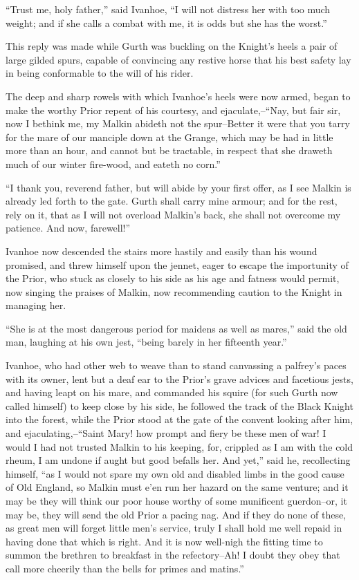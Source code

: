 ``Trust me, holy father,'' said Ivanhoe, ``I will not distress her with
too much weight; and if she calls a combat with me, it is odds but she
has the worst.''

This reply was made while Gurth was buckling on the Knight's heels a
pair of large gilded spurs, capable of convincing any restive horse that
his best safety lay in being conformable to the will of his rider.

The deep and sharp rowels with which Ivanhoe's heels were now armed,
began to make the worthy Prior repent of his courtesy, and
ejaculate,--``Nay, but fair sir, now I bethink me, my Malkin abideth not
the spur--Better it were that you tarry for the mare of our manciple
down at the Grange, which may be had in little more than an hour, and
cannot but be tractable, in respect that she draweth much of our winter
fire-wood, and eateth no corn.''

``I thank you, reverend father, but will abide by your first offer, as I
see Malkin is already led forth to the gate. Gurth shall carry mine
armour; and for the rest, rely on it, that as I will not overload
Malkin's back, she shall not overcome my patience. And now, farewell!''

Ivanhoe now descended the stairs more hastily and easily than his wound
promised, and threw himself upon the jennet, eager to escape the
importunity of the Prior, who stuck as closely to his side as his age
and fatness would permit, now singing the praises of Malkin, now
recommending caution to the Knight in managing her.

``She is at the most dangerous period for maidens as well as mares,''
said the old man, laughing at his own jest, ``being barely in her
fifteenth year.''

Ivanhoe, who had other web to weave than to stand canvassing a palfrey's
paces with its owner, lent but a deaf ear to the Prior's grave advices
and facetious jests, and having leapt on his mare, and commanded his
squire (for such Gurth now called himself) to keep close by his side, he
followed the track of the Black Knight into the forest, while the Prior
stood at the gate of the convent looking after him, and
ejaculating,--``Saint Mary! how prompt and fiery be these men of war! I
would I had not trusted Malkin to his keeping, for, crippled as I am
with the cold rheum, I am undone if aught but good befalls her. And
yet,'' said he, recollecting himself, ``as I would not spare my own old
and disabled limbs in the good cause of Old England, so Malkin must e'en
run her hazard on the same venture; and it may be they will think our
poor house worthy of some munificent guerdon--or, it may be, they will
send the old Prior a pacing nag. And if they do none of these, as great
men will forget little men's service, truly I shall hold me well repaid
in having done that which is right. And it is now well-nigh the fitting
time to summon the brethren to breakfast in the refectory--Ah! I doubt
they obey that call more cheerily than the bells for primes and
matins.''

